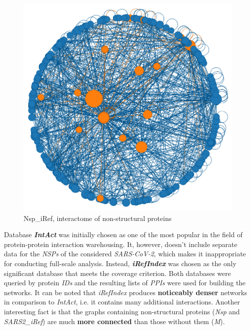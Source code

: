 \documentclass[a4paper]{article}
\begin{document}
\begin{figure}[h!]
  \centering
  \includegraphics[scale=0.45]{Nsp_iRef.png}
  \caption{Nsp\_iRef, interactome of non-structural proteins}
  \label{nsp}
\end{figure}

Database \textbf{\textit{IntAct}}\footnotemark {} was initially chosen as one of the most popular in the field of protein-protein interaction warehousing. It, however, doesn't include separate data for the \textit{NSPs} of the considered \textit{SARS-CoV-2}\footnotemark{}, which makes it inappropriate for conducting full-scale analysis. Instead, \textbf{\textit{iRefIndex}}\footnotemark {} was chosen as the only significant database that meets the coverage criterion. Both databases were queried by protein \textit{IDs} and the resulting lists of \textit{PPIs} were used for building the networks. It can be noted that \textit{iRefIndex} produces \textbf{noticeably denser} networks in comparison to \textit{IntAct}, i.e. it contains many additional interactions. Another interesting fact is that the graphs containing non-structural proteins (\textit{Nsp} and \textit{SARS2\_iRef}) are much \textbf{more connected} than those without them (\textit{M}).
\end{document}

